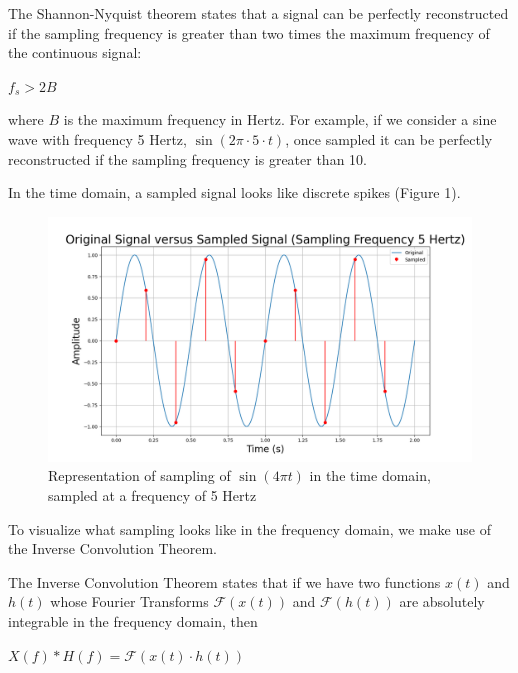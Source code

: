 \documentclass{article}
\begin{document}
The Shannon-Nyquist theorem states that a signal can be perfectly reconstructed if the sampling frequency is greater than two times the maximum frequency of the continuous signal:
\begin{center}
    \begin{math}
        f_s > 2B
    \end{math}  
\end{center}
where $B$ is the maximum frequency in Hertz.
For example, if we consider a sine wave with frequency 5 Hertz, $\sin(2\pi \cdot 5 \cdot t)$, once sampled it can be perfectly reconstructed if the sampling frequency is greater than 10.


In the time domain, a sampled signal looks like discrete spikes (Figure 1). 
\begin{figure}
    \includegraphics[width=\linewidth]{ogvssampled_BIG.png}
    \caption{Representation of sampling of $\sin(4\pi t)$ in the time domain, sampled at a frequency of 5 Hertz}
    \label{fig:grid}

\end{figure}
To visualize what sampling looks like in the frequency domain, we make use of the Inverse Convolution Theorem.

The Inverse Convolution Theorem states that if we have two functions $x(t)$ and $h(t)$ whose Fourier Transforms $\mathcal{F}(x(t))$ and $\mathcal{F}(h(t))$ are absolutely integrable in the frequency domain,
then 
\begin{center}
    \begin{math}
        X(f) * H(f) = \mathcal{F}(x(t) \cdot h(t))
    \end{math}  
\end{center}
\end{document}
